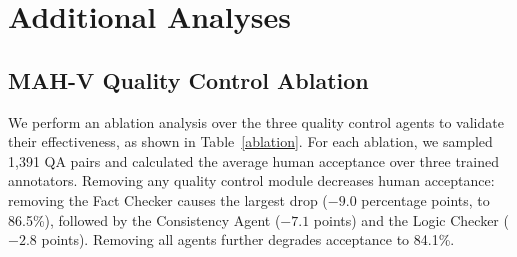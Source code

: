 \section{Additional Analyses}
\label{sec:additional}

\subsection{MAH-V Quality Control Ablation}
\label{sec:ablation_mahv}
We perform an ablation analysis over the three quality control agents to validate their effectiveness, as shown in Table~\ref{ablation}. For each ablation, we sampled 1{,}391 QA pairs and calculated the average human acceptance over three trained annotators. Removing any quality control module decreases human acceptance: removing the Fact Checker causes the largest drop ($-9.0$ percentage points, to 86.5\%), followed by the Consistency Agent ($-7.1$ points) and the Logic Checker ($-2.8$ points). Removing all agents further degrades acceptance to 84.1\%.

\begin{table}[t!]
\centering
\caption{Ablation study evaluating the impact of each quality control agent on the acceptability of the synthesized tasks.}
\label{ablation}
\vspace{-3mm}
\end{table}


